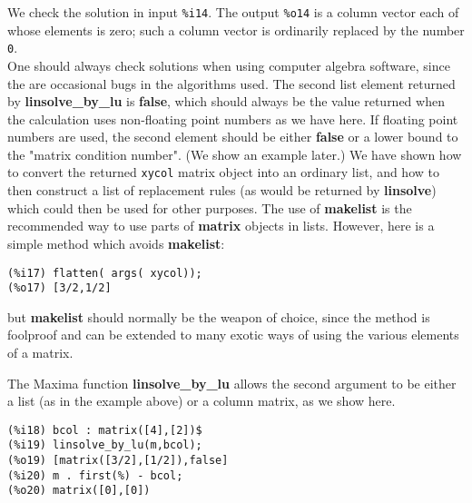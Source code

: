 \documentclass[12pt]{article}
\begin{document}
We check the solution in input \verb|%i14|.
The output \verb|%o14| is a column vector each of whose elements is zero;
  such a column vector is ordinarily replaced by the number \verb|0|.\\
  
One should always check solutions when using computer algebra software,
  since the are occasional bugs in the algorithms used.
The second list element returned by \textbf{linsolve\_by\_lu} is \textbf{false}, which 
  should always be the value returned when the calculation uses non-floating point numbers
  as we have here.
If floating point numbers are used, the second element should be either \textbf{false} or
  a lower bound to the "matrix condition number". 
(We show an example later.)
We have shown how to convert the returned \verb|xycol| matrix object into an
  ordinary list, and how to then construct a list of replacement rules (as would be
  returned by \textbf{linsolve}) which could then be used for other purposes.
The use of \textbf{makelist} is the recommended way to use parts of
  \textbf{matrix} objects in lists.
However, here is a simple method which avoids \textbf{makelist}:
\small
\begin{verbatim}
(%i17) flatten( args( xycol));
(%o17) [3/2,1/2]
\end{verbatim}
\normalsize
but \textbf{makelist} should normally be the weapon of choice, since the method is foolproof and
  can be extended to many exotic ways of using the various elements of a matrix.  
 
 \smallskip
The Maxima function \textbf{linsolve\_by\_lu} allows the second argument
   to be either a list (as in the example above) or a column matrix, as we
   show here.

\small
\begin{verbatim}
(%i18) bcol : matrix([4],[2])$
(%i19) linsolve_by_lu(m,bcol);
(%o19) [matrix([3/2],[1/2]),false]
(%i20) m . first(%) - bcol;
(%o20) matrix([0],[0])
\end{verbatim}
\normalsize
\end{document}
